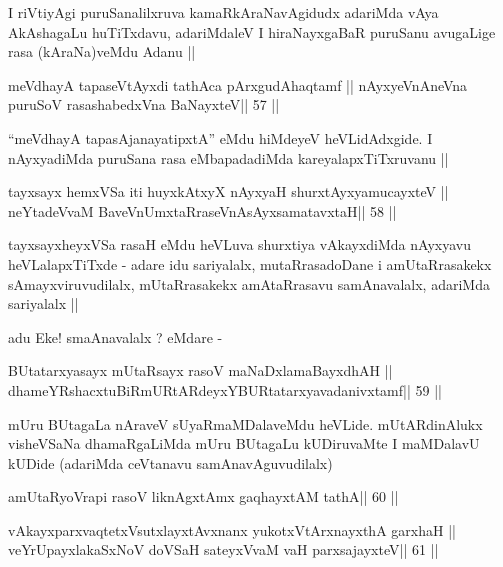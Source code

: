 \begin{artha}
I riVtiyAgi puruSanalilxruva kamaRkAraNavAgidudx adariMda vAya
AkAshagaLu huTiTxdavu, adariMdaleV I hiraNayxgaBaR puruSanu avugaLige
rasa (kAraNa)veMdu Adanu ||
\end{artha}

\begin{shl}
meVdhayA tapaseVtAyxdi tathAca pArxgudAhaqtamf ||
nAyxyeVnAneVna puruSoV rasashabedxVna BaNayxteV\hfill || 57 ||
\end{shl}

\begin{artha}
``meVdhayA tapasA\s janayatipxtA'' eMdu hiMdeyeV heVLidAdxgide. I
nAyxyadiMda puruSana rasa eMbapadadiMda kareyalapxTiTxruvanu ||
\end{artha}

\begin{shl}
tayxsayx hemxVSa iti huyxkAtxyX nAyxyaH shurxtAyx\s yamucayxteV ||
neYtadeVvaM BaveVnUmxtaRraseVnAsAyxsamatavxtaH\hfill || 58 ||
\end{shl}

\begin{artha}
tayxsayxheyxVSa rasaH eMdu heVLuva shurxtiya vAkayxdiMda nAyxyavu
heVLalapxTiTxde - adare idu sariyalalx, mutaRrasadoDane i
amUtaRrasakekx sAmayxviruvudilalx, mUtaRrasakekx amAtaRrasavu
samAnavalalx, adariMda sariyalalx ||

adu Eke! smaAnavalalx ? eMdare -
\end{artha}

\begin{shl}
BUtatarxyasayx mUtaRsayx rasoV maNaDxlamaBayxdhAH ||
dhameYRshacxtuBiRmURtARdeyxYBURtatarxyavadanivxtamf\hfill || 59 ||
\end{shl}

\begin{artha}
mUru BUtagaLa nAraveV sUyaRmaMDalaveMdu heVLide. mUtARdinAlukx
visheVSaNa dhamaRgaLiMda mUru BUtagaLu kUDiruvaMte I maMDalavU kUDide
(adariMda ceVtanavu samAnavAguvudilalx)
\end{artha}

\begin{shl}
\footnotemark[1]amUtaRyoVrapi rasoV liknAgxtAmx gaqhayxtAM tathA\hfill || 60 ||
\end{shl}

\begin{shl}
vAkayxparxvaqtetxVsutxlayxtAvxnanx yukotxV\s tArxnayxthA garxhaH ||
veYrUpayxlakaSxNoV doVSaH sateyxVvaM vaH parxsajayxteV\hfill || 61 ||
\end{shl}

